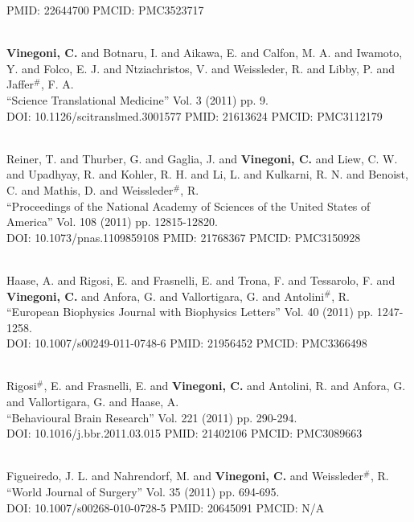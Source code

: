 PMID: 22644700 PMCID: PMC3523717\item {} \\ {\bf Vinegoni, C.} and Botnaru, I. and Aikawa, E. and Calfon, M. A. and Iwamoto, Y. and Folco, E. J. and Ntziachristos, V. and Weissleder, R. and Libby, P. and Jaffer$^\#$, F. A. \\ ``Science Translational Medicine'' Vol. 3 (2011) pp. 9. \\ DOI: 10.1126/scitranslmed.3001577 PMID: 21613624 PMCID: PMC3112179\item {} \\ Reiner, T. and Thurber, G. and Gaglia, J. and {\bf Vinegoni, C.} and Liew, C. W. and Upadhyay, R. and Kohler, R. H. and Li, L. and Kulkarni, R. N. and Benoist, C. and Mathis, D. and Weissleder$^\#$, R. \\ ``Proceedings of the National Academy of Sciences of the United States of America'' Vol. 108 (2011) pp. 12815-12820. \\ DOI: 10.1073/pnas.1109859108 PMID: 21768367 PMCID: PMC3150928\item {} \\ Haase, A. and Rigosi, E. and Frasnelli, E. and Trona, F. and Tessarolo, F. and {\bf Vinegoni, C.} and Anfora, G. and Vallortigara, G. and Antolini$^\#$, R. \\ ``European Biophysics Journal with Biophysics Letters'' Vol. 40 (2011) pp. 1247-1258. \\ DOI: 10.1007/s00249-011-0748-6 PMID: 21956452 PMCID: PMC3366498\item {} \\ Rigosi$^\#$, E. and Frasnelli, E. and {\bf Vinegoni, C.} and Antolini, R. and Anfora, G. and Vallortigara, G. and Haase, A. \\ ``Behavioural Brain Research'' Vol. 221 (2011) pp. 290-294. \\ DOI: 10.1016/j.bbr.2011.03.015 PMID: 21402106 PMCID: PMC3089663\item {} \\ Figueiredo, J. L. and Nahrendorf, M. and {\bf Vinegoni, C.} and Weissleder$^\#$, R. \\ ``World Journal of Surgery'' Vol. 35 (2011) pp. 694-695. \\ DOI: 10.1007/s00268-010-0728-5 PMID: 20645091 PMCID: N/A\item 